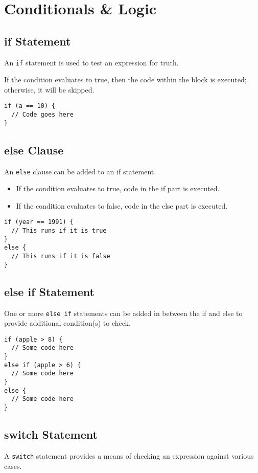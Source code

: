 \chapter{Conditionals \& Logic}
\section{if Statement}
An \verb!if! statement is used to test an expression for truth.

If the condition evaluates to true, then the code within the block is executed;  
otherwise, it will be skipped.

\begin{verbatim}
if (a == 10) {
  // Code goes here
}    
\end{verbatim}

\section{else Clause}
An \verb!else! clause can be added to an if statement.

\begin{itemize}
    \item If the condition evaluates to true, code in the if part is executed.
    \item If the condition evaluates to false, code in the else part is executed.
\end{itemize}

\begin{verbatim}
if (year == 1991) {
  // This runs if it is true
}
else {
  // This runs if it is false
}    
\end{verbatim}

\section{else if Statement}
One or more \verb!else if! statements can be added in between the if and else to provide additional condition(s) to check.

\begin{verbatim}
if (apple > 8) {
  // Some code here
}
else if (apple > 6) {
  // Some code here
}
else {
  // Some code here
}    
\end{verbatim}

\section{switch Statement}
A \verb!switch! statement provides a means of checking an expression against various cases.  

